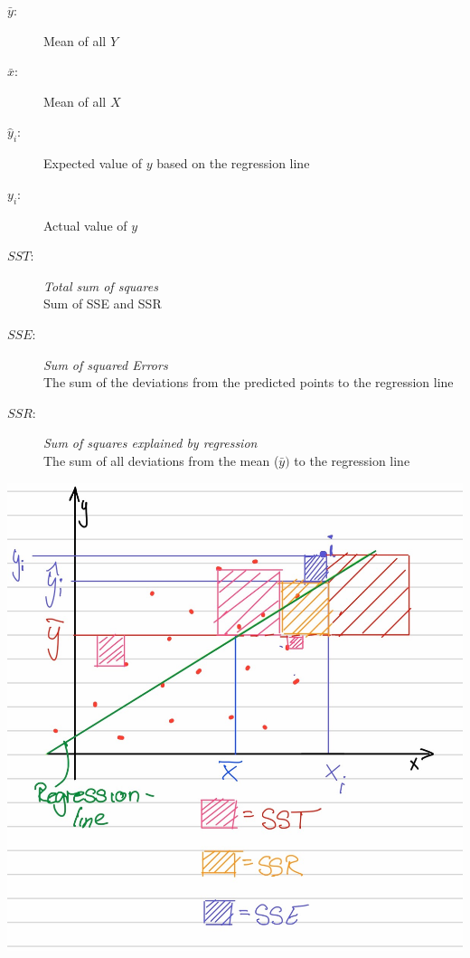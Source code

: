 \documentclass[a4paper, 11pt]{article}
\begin{document}
\begin{minipage}{0.4\textwidth}
    \begin{description}
        \item[$\bar y$:] Mean of all $Y$ 
        \item[$\bar x$:] Mean of all $X$ 
        \item[$\hat y_{i}$:] Expected value of $y$ based on the regression line 
        \item[$y_{i}$:] Actual value of $y$
        \item[$SST:$] \textit{Total sum of squares} \\
            Sum of SSE and SSR
        \item[$SSE:$ ] \textit{Sum of squared Errors} \\
            The sum of the deviations from the predicted points to the regression line
        \item[$SSR:$ ] \textit{Sum of squares explained by regression} \\
            The sum of all deviations from the mean ($\bar y)$ to the regression line
    \end{description}
\end{minipage} \hfill
\begin{minipage}{0.6\textwidth}
    \includegraphics[keepaspectratio=true,width=\textwidth]{SST.JPG}
\end{minipage}
\end{document}
